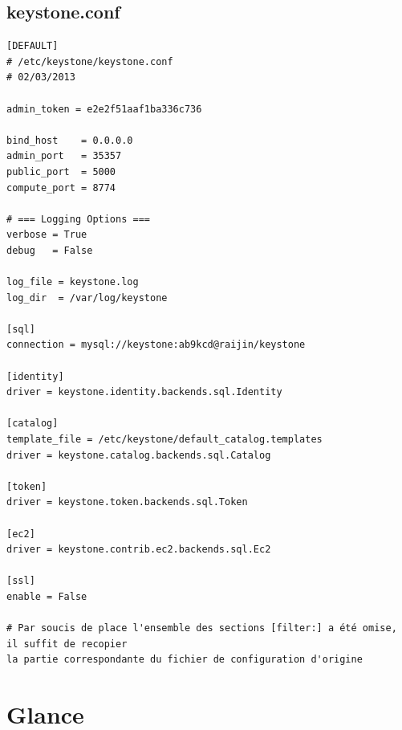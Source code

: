 \documentclass[a4paper,oneside]{report}
\begin{document}
\subsection{keystone.conf}
\begin{verbatim}
[DEFAULT]
# /etc/keystone/keystone.conf
# 02/03/2013

admin_token = e2e2f51aaf1ba336c736

bind_host    = 0.0.0.0
admin_port   = 35357
public_port  = 5000
compute_port = 8774

# === Logging Options ===
verbose = True
debug   = False

log_file = keystone.log
log_dir  = /var/log/keystone

[sql]
connection = mysql://keystone:ab9kcd@raijin/keystone

[identity]
driver = keystone.identity.backends.sql.Identity

[catalog]
template_file = /etc/keystone/default_catalog.templates
driver = keystone.catalog.backends.sql.Catalog

[token]
driver = keystone.token.backends.sql.Token

[ec2]
driver = keystone.contrib.ec2.backends.sql.Ec2

[ssl]
enable = False

# Par soucis de place l'ensemble des sections [filter:] a été omise,  il suffit de recopier
la partie correspondante du fichier de configuration d'origine
\end{verbatim}

\newpage
\section{Glance} \label{conf:Glance}
\end{document}
